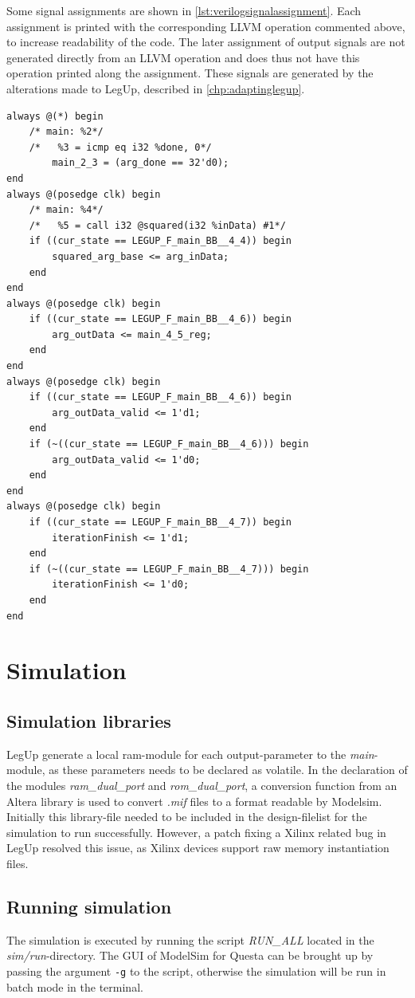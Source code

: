 Some signal assignments are shown in \cref{lst:verilogsignalassignment}. Each assignment is printed with the corresponding LLVM operation commented above, to increase readability of the code. The later assignment of output signals are not generated directly from an LLVM operation and does thus not have this operation printed along the assignment. These signals are generated by the alterations made to LegUp, described in \cref{chp:adaptinglegup}.
\begin{lstlisting}[caption={Verilog FSM},label=lst:verilogsignalassignment]
always @(*) begin
	/* main: %2*/
	/*   %3 = icmp eq i32 %done, 0*/
		main_2_3 = (arg_done == 32'd0);
end
always @(posedge clk) begin
	/* main: %4*/
	/*   %5 = call i32 @squared(i32 %inData) #1*/
	if ((cur_state == LEGUP_F_main_BB__4_4)) begin
		squared_arg_base <= arg_inData;
	end
end
always @(posedge clk) begin
	if ((cur_state == LEGUP_F_main_BB__4_6)) begin
		arg_outData <= main_4_5_reg;
	end
end
always @(posedge clk) begin
	if ((cur_state == LEGUP_F_main_BB__4_6)) begin
		arg_outData_valid <= 1'd1;
	end
	if (~((cur_state == LEGUP_F_main_BB__4_6))) begin
		arg_outData_valid <= 1'd0;
	end
end
always @(posedge clk) begin
	if ((cur_state == LEGUP_F_main_BB__4_7)) begin
		iterationFinish <= 1'd1;
	end
	if (~((cur_state == LEGUP_F_main_BB__4_7))) begin
		iterationFinish <= 1'd0;
	end
end
\end{lstlisting}

\section{Simulation}
\subsection{Simulation libraries}

LegUp generate a local \gls{ram}-module for each output-parameter to the \textit{main}-module, as these parameters needs to be declared as volatile. In the declaration of the modules \textit{ram\_dual\_port} and \textit{rom\_dual\_port}, a conversion function from an Altera library is used to convert \textit{.mif} files to a format readable by Modelsim. Initially this library-file needed to be included in the design-filelist for the simulation to run successfully. However, a patch fixing a Xilinx related bug in LegUp \cite{legupxilinx} resolved this issue, as Xilinx devices support raw memory instantiation files.

\subsection{Running simulation}
The simulation is executed by running the script \textit{RUN\_ALL} located in the \textit{sim/run}-directory. The GUI of ModelSim for Questa can be brought up by passing the argument \verb!-g! to the script, otherwise the simulation will be run in batch mode in the terminal.

